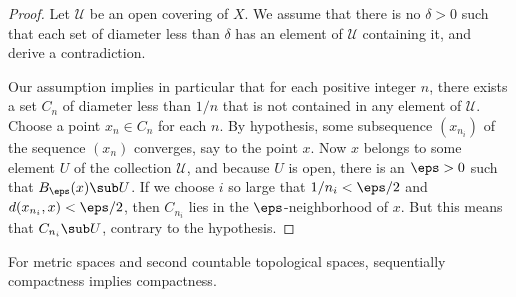 \begin{proof}
Let $\mathcal{U}$ be an open covering of $X$. We assume that there is no $\delta>0$ such that each set of diameter less than $\delta$ has an element of $\mathcal{U}$ containing it, and derive a contradiction.\par
Our assumption implies in particular that for each positive integer $n$, there exists a set $C_n$ of diameter less than $1/n$ that is not contained in any element of $\mathcal{U}$. Choose a point $x_n\in C_n$ for each $n$. By hypothesis, some subsequence $(x_{n_i})$ of the sequence $(x_n)$ converges, say to the point $x$. Now $x$ belongs to some element $U$ of the collection $\mathcal{U}$, and because $U$ is open, there is an $\eps>0$ such that $B_{\eps}(x)\sub U$. If we choose $i$ so large that $1/n_i<\eps/2$ and $d(x_{n_i},x)<\eps/2$, then $C_{n_i}$ lies in the $\eps$-neighborhood of $x$. But this means that $C_{n_i}\sub U$, contrary to the hypothesis.
\end{proof}
\begin{proposition}\label{metric 2-countable seq compact to compact}
For metric spaces and second countable topological spaces, sequentially compactness implies compactness.
\end{proposition}

